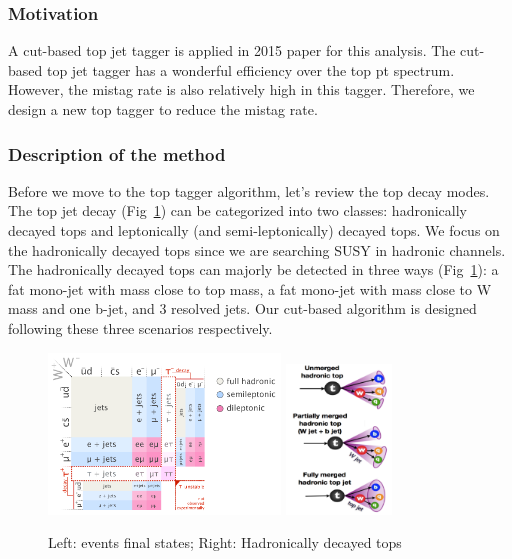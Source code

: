 \subsubsection{Motivation}
A cut-based top jet tagger is applied in 2015 paper for this analysis\cite{CMS-PAS-SUS-16-030}. The cut-based top jet tagger has a wonderful efficiency over the top pt spectrum. However, the mistag rate is also relatively high in this tagger. Therefore, we design a new top tagger to reduce the mistag rate. 

\subsubsection{Description of the method}
\label{sec:toptagger}

Before we move to the top tagger algorithm, let’s review the top decay modes. The top jet decay (Fig~\ref{fig:c4twdecaymod}) can be categorized into two classes: hadronically decayed tops and leptonically (and semi-leptonically) decayed tops. We focus on the hadronically decayed tops since we are searching SUSY in hadronic channels. The hadronically decayed tops can majorly be detected in three ways (Fig~\ref{fig:c4twdecaymod}): a fat mono-jet with mass close to top mass, a fat mono-jet with mass close to W mass and one b-jet, and 3 resolved jets. Our cut-based algorithm is designed following these three scenarios respectively. 

\begin{figure}[htbp]
 \begin{center}
  \includegraphics[width=0.55\textwidth]{figures/c4/c4_top_w_decaymod.png}
  \includegraphics[width=0.25\textwidth]{figures/c4/c4_tagger_hadtopdecay.png}
 \end{center}
 \caption{Left: \ttbar events final states; Right: Hadronically decayed tops}
 \label{fig:c4twdecaymod}
\end{figure}


